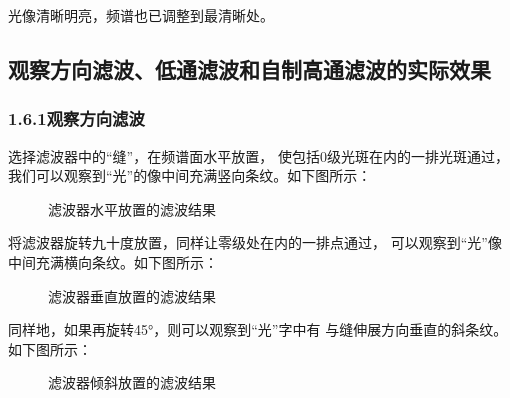 \documentclass[11pt]{article}
\begin{document}

光像清晰明亮，频谱也已调整到最清晰处。

\subsection{观察方向滤波、低通滤波和自制高通滤波的实际效果}

\subsubsection*{1.6.1观察方向滤波}

选择滤波器中的“缝”，在频谱面水平放置，
使包括0级光斑在内的一排光斑通过，
我们可以观察到“光”的像中间充满竖向条纹。如下图所示：

\begin{figure}[H]
    \centering
    \hspace{0.5cm}
    \caption{滤波器水平放置的滤波结果}
\end{figure}

\newpage
将滤波器旋转九十度放置，同样让零级处在内的一排点通过，
可以观察到“光”像中间充满横向条纹。如下图所示：

\begin{figure}[H]
    \centering
    \hspace{0.5cm}
    \caption{滤波器垂直放置的滤波结果}
\end{figure}

同样地，如果再旋转45°，则可以观察到“光”字中有
与缝伸展方向垂直的斜条纹。
如下图所示：

\begin{figure}[H]
    \centering
    \hspace{0.5cm}
    \caption{滤波器倾斜放置的滤波结果}
\end{figure}
\end{document}
